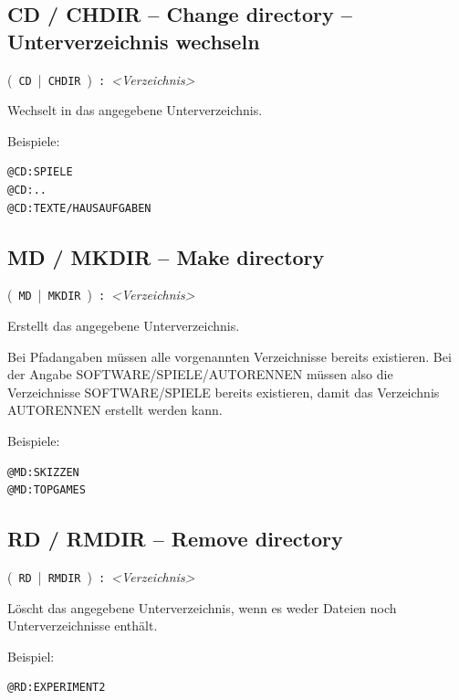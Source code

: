 \documentclass[10pt,a4paper]{scrartcl}		%
\begin{document}
\subsection{CD / CHDIR -- Change directory -- Unterverzeichnis wechseln}
\mbox{\Big( \texttt{CD} \Big| \texttt{CHDIR} \Big) 
\texttt{:} \textit{<Verzeichnis>}}

Wechselt in das angegebene Unterverzeichnis.

Beispiele:
\begin{verbatim}
@CD:SPIELE
@CD:..
@CD:TEXTE/HAUSAUFGABEN
\end{verbatim}

\subsection{MD / MKDIR -- Make directory}

\mbox{\Big( \texttt{MD} \Big| \texttt{MKDIR} \Big) 
\texttt{:} \textit{<Verzeichnis>}}

Erstellt das angegebene Unterverzeichnis. 

Bei Pfadangaben müssen
alle vorgenannten Verzeichnisse bereits existieren. Bei der
Angabe SOFTWARE/SPIELE/AUTORENNEN müssen also die Verzeichnisse
SOFTWARE/SPIELE bereits existieren, damit das Verzeichnis AUTORENNEN 
erstellt werden kann.

Beispiele:
\begin{verbatim}
@MD:SKIZZEN
@MD:TOPGAMES
\end{verbatim}



\subsection{RD / RMDIR -- Remove directory}

\mbox{\Big( \texttt{RD} \Big| \texttt{RMDIR} \Big) 
\texttt{:} \textit{<Verzeichnis>}}

Löscht das angegebene Unterverzeichnis, wenn es weder
Dateien noch Unterverzeichnisse enthält.

Beispiel:
\begin{verbatim}
@RD:EXPERIMENT2
\end{verbatim}


\label{xcommands}
\end{document}

